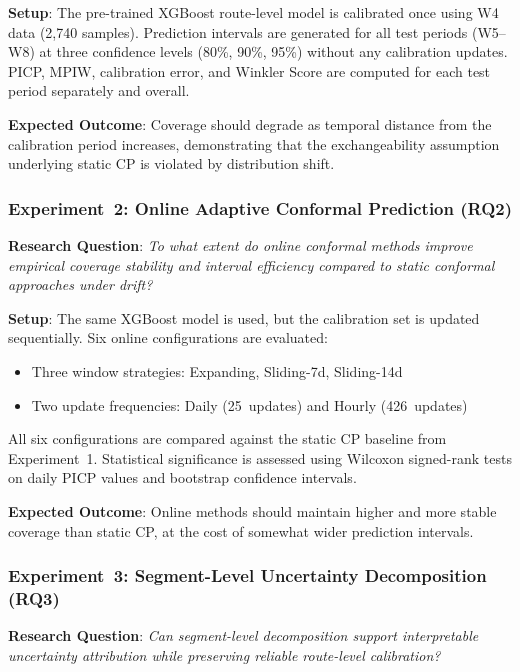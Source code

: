 \textbf{Setup}: The pre-trained XGBoost route-level model is calibrated once using W4 data (2,740 samples). Prediction intervals are generated for all test periods (W5--W8) at three confidence levels (80\%, 90\%, 95\%) without any calibration updates. PICP, MPIW, calibration error, and Winkler Score are computed for each test period separately and overall.

\textbf{Expected Outcome}: Coverage should degrade as temporal distance from the calibration period increases, demonstrating that the exchangeability assumption underlying static CP is violated by distribution shift.

\subsubsection{Experiment~2: Online Adaptive Conformal Prediction (RQ2)}
\label{subsubsec:exp2_design}

\textbf{Research Question}: \emph{To what extent do online conformal methods improve empirical coverage stability and interval efficiency compared to static conformal approaches under drift?}

\textbf{Setup}: The same XGBoost model is used, but the calibration set is updated sequentially. Six online configurations are evaluated:
\begin{itemize}
    \item Three window strategies: Expanding, Sliding-7d, Sliding-14d
    \item Two update frequencies: Daily (25~updates) and Hourly (426~updates)
\end{itemize}

All six configurations are compared against the static CP baseline from Experiment~1. Statistical significance is assessed using Wilcoxon signed-rank tests on daily PICP values and bootstrap confidence intervals.

\textbf{Expected Outcome}: Online methods should maintain higher and more stable coverage than static CP, at the cost of somewhat wider prediction intervals.

\subsubsection{Experiment~3: Segment-Level Uncertainty Decomposition (RQ3)}
\label{subsubsec:exp3_design}

\textbf{Research Question}: \emph{Can segment-level decomposition support interpretable uncertainty attribution while preserving reliable route-level calibration?}

